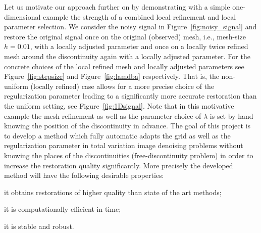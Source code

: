 \documentclass[enabledeprecatedfontcommands,cleardoublepage=empty,headsepline,twoside,11pt,DIV=15,BCOR=12mm,final]{scrartcl}
\begin{document}
Let us motivate our approach further on by demonstrating with a simple one-dimensional example the strength of a combined local refinement and local parameter selection. We consider the noisy signal in Figure~\ref{fig:noisy_signal} and restore the original signal once on the original (observed) mesh, i.e., mesh-size $h=0.01$, with a locally adjusted parameter and once on a locally twice refined mesh around the discontinuity again with a locally adjusted parameter. For the concrete choices of the local refined mesh and locally adjusted parameters see Figure~\ref{fig:stepsize} and Figure~\ref{fig:lamdba} respectively. That is, the non-uniform (locally refined) case allows for a more precise choice of the regularization parameter leading to a significantly more accurate restoration than the uniform setting, see Figure~\ref{fig:1Dsignal}.
 Note that in this motivative example the mesh refinement as well as the parameter choice of $\lambda$ is set by hand knowing the position of the discontinuity in advance. The goal of this project is to develop a method which fully automatic adapts the grid as well as the regularization parameter in total variation image denoising problems without knowing the places of the discontinuities (free-discontinuity problem) in order to increase the restoration quality significantly. More precisely the developed method will have the following desirable properties: 
\begin{inparaenum}[(i)]
\item it obtains restorations of higher quality than state of the art methods;
\item it is computationally efficient in time;
\item it is stable and robust.
\end{inparaenum}
\end{document}
